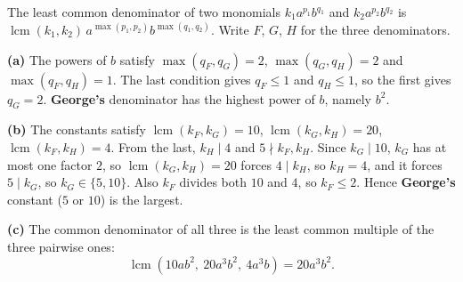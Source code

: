The least common denominator of two monomials $k_1a^{p_1}b^{q_1}$ and $k_2a^{p_2}b^{q_2}$ is $\operatorname{lcm}(k_1,k_2)\,a^{\max(p_1,p_2)}b^{\max(q_1,q_2)}$. Write $F$, $G$, $H$ for the three denominators.

\textbf{(a)} The powers of $b$ satisfy $\max(q_F,q_G)=2$, $\max(q_G,q_H)=2$ and $\max(q_F,q_H)=1$. The last condition gives $q_F\le1$ and $q_H\le1$, so the first gives $q_G=2$. \textbf{George's} denominator has the highest power of $b$, namely $b^2$.

\textbf{(b)} The constants satisfy $\operatorname{lcm}(k_F,k_G)=10$, $\operatorname{lcm}(k_G,k_H)=20$, $\operatorname{lcm}(k_F,k_H)=4$. From the last, $k_H\mid4$ and $5\nmid k_F,k_H$. Since $k_G\mid10$, $k_G$ has at most one factor $2$, so $\operatorname{lcm}(k_G,k_H)=20$ forces $4\mid k_H$, so $k_H=4$, and it forces $5\mid k_G$, so $k_G\in\{5,10\}$. Also $k_F$ divides both $10$ and $4$, so $k_F\le2$. Hence \textbf{George's} constant ($5$ or $10$) is the largest.

\textbf{(c)} The common denominator of all three is the least common multiple of the three pairwise ones:
\[
\operatorname{lcm}\left(10ab^2,\ 20a^3b^2,\ 4a^3b\right)=\boxed{20a^3b^2}.
\]
